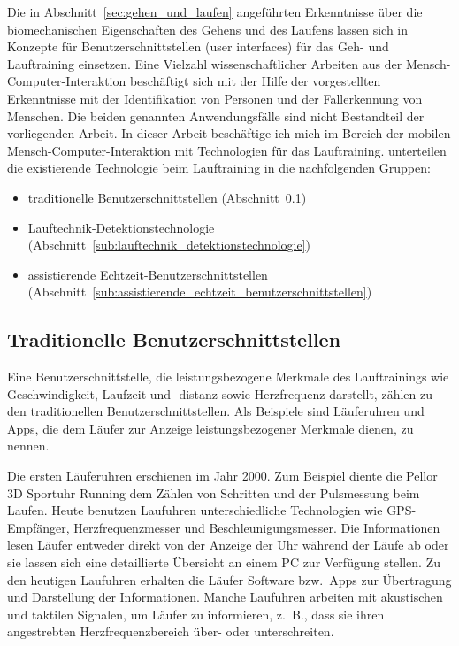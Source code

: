 \label{sec:existierende_technologien_beim_lauftraining}

Die in Abschnitt~\ref{sec:gehen_und_laufen} angeführten Erkenntnisse über die biomechanischen Eigenschaften des Gehens und des Laufens lassen sich in Konzepte für Benutzerschnittstellen (user interfaces) für das Geh- und Lauftraining einsetzen. Eine Vielzahl wissenschaftlicher Arbeiten aus der Mensch-Computer-Interaktion beschäftigt sich mit der Hilfe der vorgestellten Erkenntnisse mit der Identifikation von Personen und der Fallerkennung von Menschen. Die beiden genannten Anwendungsfälle sind nicht Bestandteil der vorliegenden Arbeit. In dieser Arbeit beschäftige ich mich im Bereich der mobilen Mensch-Computer-Interaktion mit Technologien für das Lauftraining. \citet{Jensen2014} unterteilen die existierende Technologie beim Lauftraining in die nachfolgenden Gruppen:
\begin{itemize}
	\item traditionelle Benutzerschnittstellen (Abschnitt~\ref{sub:traditionelle_benutzerschnittstellen}) 
	\item Lauftechnik-Detektionstechnologie (Abschnitt~\ref{sub:lauftechnik_detektionstechnologie}) 
	\item assistierende Echtzeit-Benutzerschnittstellen (Abschnitt~\ref{sub:assistierende_echtzeit_benutzerschnittstellen}) 
\end{itemize}

\subsection{Traditionelle Benutzerschnittstellen} 

\label{sub:traditionelle_benutzerschnittstellen}

Eine Benutzerschnittstelle, die leistungsbezogene Merkmale des Lauftrainings wie Geschwindigkeit, Laufzeit und -distanz sowie Herzfrequenz darstellt, zählen \citet{Jensen2014} zu den traditionellen Benutzerschnittstellen. Als Beispiele sind Läuferuhren und Apps, die dem Läufer zur Anzeige leistungsbezogener Merkmale dienen, zu nennen.

Die ersten Läuferuhren erschienen im Jahr 2000. Zum Beispiel diente die Pellor 3D Sportuhr Running dem Zählen von Schritten und der Pulsmessung beim Laufen. Heute benutzen Laufuhren unterschiedliche Technologien wie \ac{GPS}-Empfänger, Herzfrequenzmesser und Beschleunigungsmesser. Die Informationen lesen Läufer entweder direkt von der Anzeige der Uhr während der Läufe ab oder sie lassen sich eine detaillierte Übersicht an einem PC zur Verfügung stellen. Zu den heutigen Laufuhren erhalten die Läufer Software bzw.\ Apps zur Übertragung und Darstellung der Informationen. Manche Laufuhren arbeiten mit akustischen und taktilen Signalen, um Läufer zu informieren, z.~B., dass sie ihren angestrebten Herzfrequenzbereich über- oder unterschreiten.

